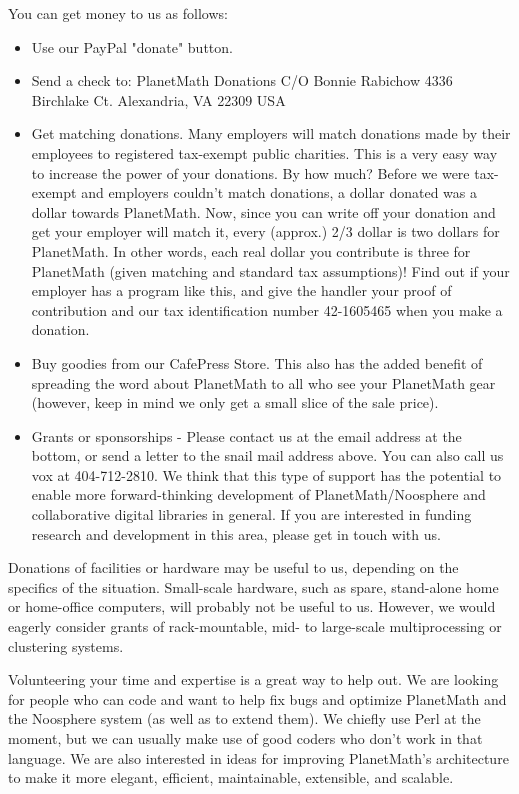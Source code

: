 You can get money to us as follows:

\begin{itemize}
\item Use our PayPal "donate" button.
\item Send a check to:
      PlanetMath Donations
      C/O Bonnie Rabichow
      4336 Birchlake Ct.
      Alexandria, VA 22309
      USA

\item Get matching donations. Many employers will match donations made by their
      employees to registered tax-exempt public charities. This is a very easy
      way to increase the power of your donations. By how much? Before we were
      tax-exempt and employers couldn't match donations, a dollar donated was a
      dollar towards PlanetMath. Now, since you can write off your donation and
      get your employer will match it, every (approx.) 2/3 dollar is two
      dollars for PlanetMath. In other words, each real dollar you contribute
      is three for PlanetMath (given matching and standard tax assumptions)!
      Find out if your employer has a program like this, and give the handler
      your proof of contribution and our tax identification number 42-1605465
      when you make a donation.
\item Buy goodies from our CafePress Store.
      This also has the added benefit of spreading the word about PlanetMath to
      all who see your PlanetMath gear (however, keep in mind we only get a
      small slice of the sale price).
\item Grants or sponsorships - Please contact us at the email address at the
      bottom, or send a letter to the snail mail address above. You can also
      call us vox at 404-712-2810.
      We think that this type of support has the potential to enable more
      forward-thinking development of PlanetMath/Noosphere and collaborative
      digital libraries in general. If you are interested in funding research
      and development in this area, please get in touch with us.
\end{itemize}

Donations of facilities or hardware may be useful to us, depending on the
specifics of the situation. Small-scale hardware, such as spare, stand-alone
home or home-office computers, will probably not be useful to us. However, we
would eagerly consider grants of rack-mountable, mid- to large-scale
multiprocessing or clustering systems.

Volunteering your time and expertise is a great way to help out. We are looking
for people who can code and want to help fix bugs and optimize PlanetMath and
the Noosphere system (as well as to extend them). We chiefly use Perl at the
moment, but we can usually make use of good coders who don't work in that
language. We are also interested in ideas for improving PlanetMath's
architecture to make it more elegant, efficient, maintainable, extensible, and
scalable.

